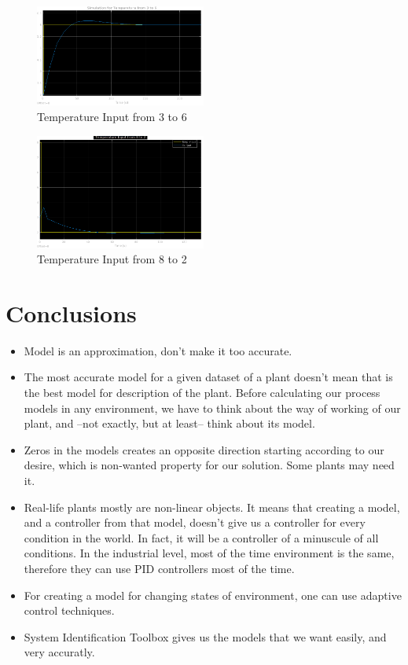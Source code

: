 \documentclass[11pt,a4paper,twocolumn]{article}
\begin{document}
\begin{figure}[H]
    \centering
    \includegraphics[width=0.5\textwidth]{Graphs/temp3to6.png}
    \caption{Temperature Input from 3 to 6}
    \label{fig:SimResult1}
\end{figure}
\begin{figure}[H]
    \centering
    \includegraphics[width=0.5\textwidth]{Graphs/temp8to2.png}
    \caption{Temperature Input from 8 to 2}
    \label{fig:SimResult2}
\end{figure}

\section{Conclusions}
\begin{itemize}
    \item Model is an approximation, don't make it too accurate.
    \item The most accurate model for a given dataset of a plant doesn't mean that is the best model for description of the plant. Before calculating our process models in any environment, we have to think about the way of working of our plant, and --not exactly, but at least-- think about its model.
    \item Zeros in the models creates an opposite direction starting according to our desire, which is non-wanted property for our solution. Some plants may need it.
    \item Real-life plants mostly are non-linear objects. It means that creating a model, and a controller from that model, doesn't give us a controller for every condition in the world. In fact, it will be a controller of a minuscule of all conditions. In the industrial level, most of the time environment is the same, therefore they can use PID controllers most of the time.
    \item For creating a model for changing states of environment, one can use adaptive control techniques.
    \item System Identification Toolbox gives us the models that we want easily, and very accuratly.
\end{itemize}
\end{document}
